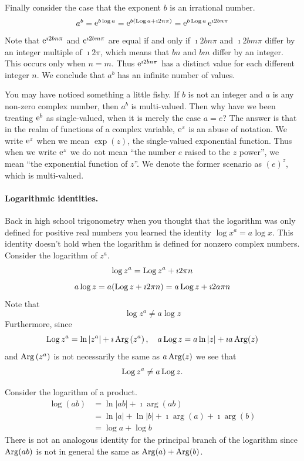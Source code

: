 Finally consider the case that the exponent $b$ is an irrational number.
\[
a^b = \mathop{\mathrm{e}}\nolimits^{b \log a} = \mathop{\mathrm{e}}\nolimits^{b (\mathop{\mathrm{Log}}\nolimits a + \imath 2 n \pi) }
= \mathop{\mathrm{e}}\nolimits^{b \mathop{\mathrm{Log}}\nolimits a} \mathop{\mathrm{e}}\nolimits^{\imath 2 b n \pi}
\]
Note that $\mathop{\mathrm{e}}\nolimits^{\imath 2 b n \pi}$ and
$\mathop{\mathrm{e}}\nolimits^{\imath 2 b m \pi}$ are equal if and only if $\imath 2 b n \pi$ and $\imath 2 b m \pi$ 
differ by an integer multiple of $\imath 2 \pi$, which means that $b n$ and $b m$ 
differ by an integer.  This occurs only when $n = m$.  Thus $\mathop{\mathrm{e}}\nolimits^{\imath 2 b n \pi}$
has a distinct value for each different integer $n$.  We conclude that
$a^b$ has an infinite number of values.

You may have noticed something a little fishy.  If $b$ is not an integer
and $a$ is any non-zero complex number, then $a^b$ is multi-valued.
Then why have we been treating $\mathop{\mathrm{e}}\nolimits^b$ as single-valued, when it is 
merely the case $a = e$?  The answer is that in the realm of functions 
of a complex variable, $\mathop{\mathrm{e}}\nolimits^z$ is an abuse of notation.  
We write $\mathop{\mathrm{e}}\nolimits^z$ when we mean $\exp(z)$, the single-valued
exponential function.  Thus when we write $\mathop{\mathrm{e}}\nolimits^z$ we do not mean 
``the number $e$ raised to the $z$ power'', 
we mean ``the exponential function of $z$''.
We denote the former scenario as $(e)^z$, which is multi-valued.








\paragraph{Logarithmic identities.}
Back in high school trigonometry when you thought that the logarithm was
only defined for positive real numbers you learned the identity
$\log x^a = a \log x$.  This identity doesn't hold when the logarithm is
defined for nonzero complex numbers.  Consider the logarithm of $z^a$.
\[
\log z^a = \mathop{\mathrm{Log}}\nolimits z^a + \imath 2 \pi n
\]
\[
a \log z = a ( \mathop{\mathrm{Log}}\nolimits z + \imath 2 \pi n ) = a \mathop{\mathrm{Log}}\nolimits z + \imath 2 a \pi n
\]
Note that
\[
\log z^a \neq a \log z
\]
Furthermore, since
\[
\mathop{\mathrm{Log}}\nolimits z^a = \ln |z^a| + \imath \mathop{\mathrm{Arg}}\nolimits \left( z^a \right), \quad
a \mathop{\mathrm{Log}}\nolimits z = a \ln |z| + \imath a \mathop{\mathrm{Arg}}\nolimits(z)
\]
and $\mathop{\mathrm{Arg}}\nolimits \left( z^a \right)$ is not necessarily the same as $a \mathop{\mathrm{Arg}}\nolimits(z)$ 
we see that
\[ 
\mathop{\mathrm{Log}}\nolimits z^a \neq a \mathop{\mathrm{Log}}\nolimits z. 
\]



Consider the logarithm of a product.
\begin{align*}
  \log(a b) 
  &= \ln |a b| + \imath \arg(a b) 
  \\
  &= \ln |a| + \ln |b| + \imath \arg(a) + \imath \arg(b) 
  \\
  &= \log a + \log b
\end{align*}
There is not an analogous identity for the principal branch of the 
logarithm since $\mathop{\mathrm{Arg}}\nolimits(a b)$ is not in general the same as 
$\mathop{\mathrm{Arg}}\nolimits(a) + \mathop{\mathrm{Arg}}\nolimits(b)$.

